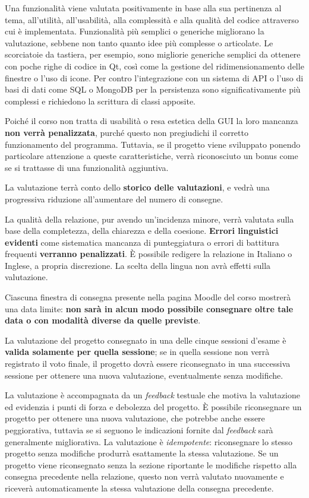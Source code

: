 \documentclass[10pt,a4paper,oneside]{article}
\begin{document}
Una funzionalità viene valutata positivamente in base alla sua pertinenza al tema, all'utilità, all'usabilità, alla complessità e alla qualità del codice attraverso cui è implementata. Funzionalità più semplici o generiche migliorano la valutazione, sebbene non tanto quanto idee più complesse o articolate. Le scorciatoie da tastiera, per esempio, sono migliorie generiche semplici da ottenere con poche righe di codice in Qt, così come la gestione del ridimensionamento delle finestre o l'uso di icone. Per contro l'integrazione con un sistema di API o l'uso di basi di dati come SQL o MongoDB per la persistenza sono significativamente più complessi e richiedono la scrittura di classi apposite.

Poiché il corso non tratta di usabilità o resa estetica della GUI la loro mancanza \textbf{non verrà penalizzata}, purché questo non pregiudichi il corretto funzionamento del programma. Tuttavia, se il progetto viene sviluppato ponendo particolare attenzione a queste caratteristiche, verrà riconosciuto un bonus come se si trattasse di una funzionalità aggiuntiva.

La valutazione terrà conto dello \textbf{storico delle valutazioni}, e vedrà una progressiva riduzione all'aumentare del numero di consegne.

La qualità della relazione, pur avendo un'incidenza minore, verrà valutata sulla base della completezza, della chiarezza e della coesione. \textbf{Errori linguistici evidenti} come sistematica mancanza di punteggiatura o errori di battitura frequenti \textbf{verranno penalizzati}. È possibile redigere la relazione in Italiano o Inglese, a propria discrezione. La scelta della lingua non avrà effetti sulla valutazione.

Ciascuna finestra di consegna presente nella pagina Moodle del corso mostrerà una data limite: \textbf{non sarà in alcun modo possibile consegnare oltre tale data o con modalità diverse da quelle previste}.

La valutazione del progetto consegnato in una delle cinque sessioni d'esame è \textbf{valida solamente per quella sessione}; se in quella sessione non verrà registrato il voto finale, il progetto dovrà essere riconsegnato in una successiva sessione per ottenere una nuova valutazione, eventualmente senza modifiche.

La valutazione è accompagnata da un \emph{feedback} testuale che motiva la valutazione ed evidenzia i punti di forza e debolezza del progetto. È possibile riconsegnare un progetto per ottenere una nuova valutazione, che potrebbe anche essere peggiorativa, tuttavia se si seguono le indicazioni fornite dal \emph{feedback} sarà generalmente migliorativa. La valutazione è \emph{idempotente}: riconsegnare lo stesso progetto senza modifiche produrrà esattamente la stessa valutazione. Se un progetto viene riconsegnato senza la sezione riportante le modifiche rispetto alla consegna precedente nella relazione, questo non verrà valutato nuovamente e riceverà automaticamente la stessa valutazione della consegna precedente.
\end{document}
